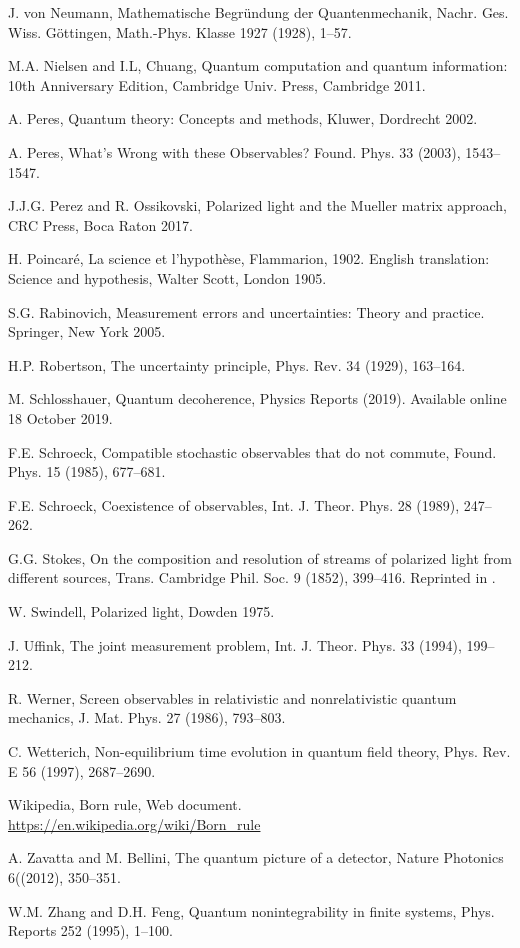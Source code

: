 \documentclass[12pt]{article}
\begin{document}
\begin{thebibliography}{99}
 J. von Neumann,
Mathematische Begr\"undung der Quantenmechanik,
Nachr. Ges. Wiss. G\"ottingen, Math.-Phys. Klasse 1927 (1928), 1--57.

 M.A. Nielsen and I.L, Chuang,
Quantum computation and quantum information: 10th Anniversary Edition,
Cambridge Univ. Press, Cambridge 2011.

 A. Peres,
Quantum theory: Concepts and methods,
Kluwer, Dordrecht 2002.

 A. Peres,
What's Wrong with these Observables?
Found. Phys. 33 (2003), 1543--1547.

J.J.G. Perez and R. Ossikovski,
Polarized light and the Mueller matrix approach,
CRC Press, Boca Raton 2017.

 H. Poincar\'e,
La science et l'hypoth\`ese,
Flammarion, 1902.
English translation:
Science and hypothesis,
Walter Scott, London 1905.

 S.G. Rabinovich,
Measurement errors and uncertainties: Theory and practice.
Springer, New York 2005.

 H.P. Robertson,
The uncertainty principle,
Phys. Rev. 34 (1929), 163--164.

 M. Schlosshauer,
Quantum decoherence,
Physics Reports (2019). Available online 18 October 2019.

 F.E. Schroeck,
Compatible stochastic observables that do not commute,
Found. Phys. 15 (1985), 677--681.

 F.E. Schroeck,
Coexistence of observables,
Int. J. Theor. Phys. 28 (1989), 247--262.

 G.G. Stokes,
On the composition and resolution of streams of polarized light
from different sources,
Trans. Cambridge Phil. Soc. 9 (1852), 399--416.
Reprinted in \cite{Swi}.

 W. Swindell,
Polarized light,
Dowden 1975.

 J. Uffink,
The joint measurement problem,
Int. J. Theor. Phys. 33 (1994), 199--212.

 R. Werner,
Screen observables in relativistic and nonrelativistic quantum
mechanics,
J. Mat. Phys. 27 (1986), 793--803.

 C. Wetterich,
Non-equilibrium time evolution in quantum field theory,
Phys. Rev. E 56 (1997), 2687--2690.

 Wikipedia,
Born rule,
Web document.\\
\url{https://en.wikipedia.org/wiki/Born_rule}

 A. Zavatta and M. Bellini,
The quantum picture of a detector,
Nature Photonics 6((2012), 350--351.

 W.M. Zhang and D.H. Feng,
Quantum nonintegrability in finite systems,
Phys. Reports 252 (1995), 1--100.

\end{thebibliography}

\end{document}

